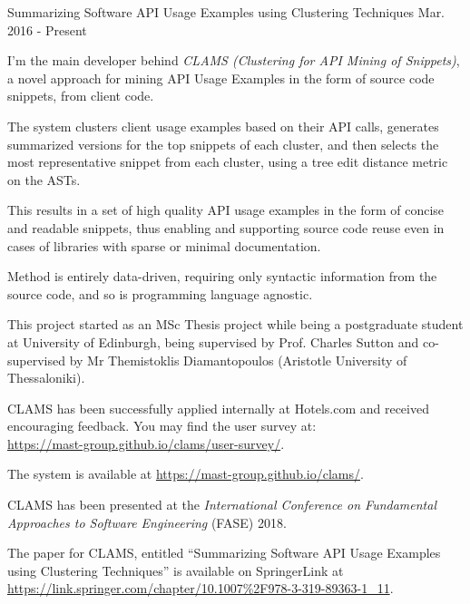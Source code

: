 

\begin{cventries}

  \cventry
    {Summarizing Software API Usage Examples using
Clustering Techniques} %
	{}
	{}
    {Mar. 2016 - Present} %
    {
      \begin{cvitems} %
        \item {I'm the main developer behind \textit{CLAMS (Clustering for API Mining of Snippets)}, a novel approach for mining API Usage Examples in the form of source code snippets, from client code.}
		\item {The system clusters client usage examples based on their API calls, generates summarized versions for the top snippets of each cluster, and then selects the most representative snippet from each cluster, using a tree edit distance metric on the ASTs.}
		\item {This results in a set of high quality API usage examples in the form of concise and readable snippets, thus enabling and supporting source code reuse even in cases of libraries with sparse or minimal documentation.}
		\item {Method is entirely data-driven, requiring only syntactic information from the source code, and so is programming language agnostic.}
		\item {This project started as an MSc Thesis project while being a postgraduate student at University of Edinburgh, being supervised by Prof. Charles Sutton and co-supervised by Mr Themistoklis Diamantopoulos (Aristotle University of Thessaloniki).}
		\item {CLAMS has been successfully applied internally at Hotels.com and received encouraging feedback. You may find the user survey at: \\
		 \url{https://mast-group.github.io/clams/user-survey/}.}
		\item {The system is available at \url{https://mast-group.github.io/clams/}.}
		\item {CLAMS has been presented at the \textit{International Conference on Fundamental Approaches to Software Engineering} (FASE) 2018.}
		\item {The paper for CLAMS, entitled ``Summarizing Software API Usage Examples using Clustering Techniques'' is available on SpringerLink at \url{https://link.springer.com/chapter/10.1007\%2F978-3-319-89363-1_11}.}
      \end{cvitems}
    }
    

\end{cventries}
